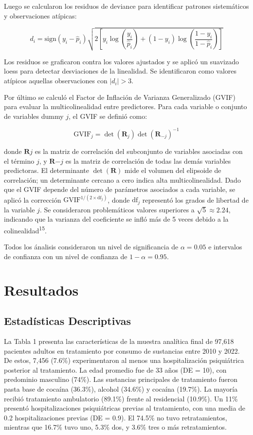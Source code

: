 \documentclass[
  spanish,
  10pt,
]{article}
\begin{document}
Luego se calcularon los residuos de deviance para identificar patrones
sistemáticos y observaciones atípicas:

\[d_i = \text{sign}(y_i - \hat{p}_i) \sqrt{2\left[y_i \log\left(\frac{y_i}{\hat{p}_i}\right) + (1-y_i)\log\left(\frac{1-y_i}{1-\hat{p}_i}\right)\right]}\]

Los residuos se graficaron contra los valores ajustados y se aplicó un
suavizado loess para detectar desviaciones de la linealidad. Se
identificaron como valores atípicos aquellas observaciones con
\(|d_i| > 3\).

Por último se calculó el Factor de Inflación de Varianza Generalizado
(GVIF) para evaluar la multicolinealidad entre predictores. Para cada
variable o conjunto de variables dummy \(j\), el GVIF se definió como:

\[\text{GVIF}_j = \det(\mathbf{R}_j)\det(\mathbf{R}_{-j})^{-1}\]

donde \(\mathbf{R}j\) es la matriz de correlación del subconjunto de
variables asociadas con el término \(j\), y \(\mathbf{R}{-j}\) es la
matriz de correlación de todas las demás variables predictoras. El
determinante \(\det(\mathbf{R})\) mide el volumen del elipsoide de
correlación; un determinante cercano a cero indica alta
multicolinealidad. Dado que el GVIF depende del número de parámetros
asociados a cada variable, se aplicó la corrección
\(\text{GVIF}^{1/(2 \times \text{df}_j)}\), donde \(\text{df}_j\)
representó los grados de libertad de la variable \(j\). Se consideraron
problemáticos valores superiores a \(\sqrt{5} \approx 2.24\), indicando
que la varianza del coeficiente se infló más de 5 veces debido a la
colinealidad\textsuperscript{15}.

Todos los ánalisis consideraron un nivel de significancia de
\(\alpha=0.05\) e intervalos de confianza con un nivel de confianza de
\(1-\alpha=0.95\).

\newpage

\section{Resultados}\label{resultados}

\subsection{Estadísticas
Descriptivas}\label{estaduxedsticas-descriptivas}

La Tabla 1 presenta las características de la muestra analítica final de
97,618 pacientes adultos en tratamiento por consumo de sustancias entre
2010 y 2022. De estos, 7,456 (7.6\%) experimentaron al menos una
hospitalización psiquiátrica posterior al tratamiento. La edad promedio
fue de 33 años (DE = 10), con predominio masculino (74\%). Las
sustancias principales de tratamiento fueron pasta base de cocaína
(36.3\%), alcohol (34.6\%) y cocaína (19.7\%). La mayoría recibió
tratamiento ambulatorio (89.1\%) frente al residencial (10.9\%). Un 11\%
presentó hospitalizaciones psiquiátricas previas al tratamiento, con una
media de 0.2 hospitalizaciones previas (DE = 0.9). El 74.5\% no tuvo
retratamientos, mientras que 16.7\% tuvo uno, 5.3\% dos, y 3.6\% tres o
más retratamientos.
\end{document}
